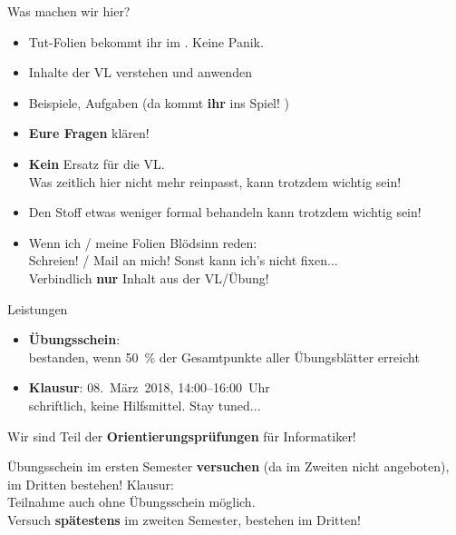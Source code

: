 \begin{frame}[t]{Was machen wir hier?}
	\begin{itemize}[<+->]
		\item Tut-Folien bekommt ihr im \ILIAS. Keine Panik.
		\item Inhalte der VL verstehen und anwenden
		\item Beispiele, Aufgaben (da kommt \textbf{ihr} ins Spiel! \smiley)
		\item \textbf{Eure Fragen} klären! 
		\item \textbf{Kein} Ersatz für die VL. \\
			  Was zeitlich hier nicht mehr reinpasst, kann trotzdem wichtig sein!
	    \item Den Stoff etwas weniger formal behandeln \impl {} kann trotzdem wichtig sein! 
	    \item Wenn ich / meine Folien Blödsinn reden: \\
		      Schreien! / Mail an mich! \impl Sonst kann ich's nicht fixen... \frownie \\
		      Verbindlich \textbf{nur} Inhalt aus der VL/Übung! 
	\end{itemize}
\end{frame}

\begin{frame}[t]{Leistungen}
	\begin{itemize}
		\item \textbf{Übungsschein}: \\
			  bestanden, wenn 50~\% der Gesamtpunkte aller Übungsblätter erreicht \\
		\item \textbf{Klausur}: 08.~März~2018, 14:00–16:00~Uhr \\
			  schriftlich, keine Hilfsmittel. \quad Stay tuned...
	\end{itemize}
	\pause
	Wir sind Teil der \textbf{Orientierungsprüfungen} für Informatiker!
	\begin{itemize}
		\implitem Übungsschein im ersten Semester \textbf{versuchen} (da im Zweiten nicht angeboten), im Dritten bestehen! 
		\implitem Klausur: \\
		Teilnahme auch ohne Übungsschein möglich. \\
		Versuch \textbf{spätestens} im zweiten Semester, bestehen im Dritten!
	\end{itemize}
	
	\pause
\end{frame}

